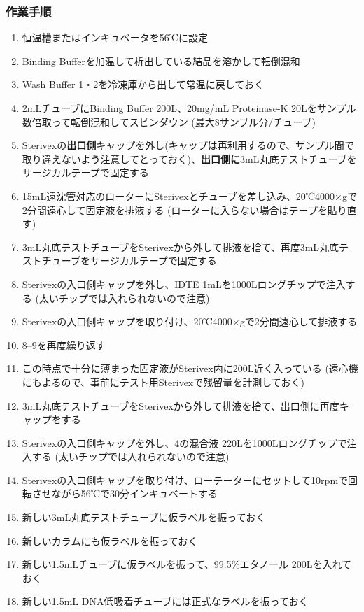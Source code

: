 \documentclass[titlepage,10pt,a4paper,uplatex]{jsbook}
\renewcommand{\textbf}[1]{{\bfseries\sffamily#1}}
\begin{document}
\subsubsection{作業手順}
\begin{enumerate}
\item 恒温槽またはインキュベータを56℃に設定
\item Binding Bufferを加温して析出している結晶を溶かして転倒混和
\item Wash Buffer 1・2を冷凍庫から出して常温に戻しておく
\item 2mLチューブにBinding Buffer 200{\textmu}L、20mg/mL Proteinase-K 20{\textmu}Lをサンプル数倍取って転倒混和してスピンダウン (最大8サンプル分/チューブ)
\item Sterivexの\textbf{出口側}キャップを外し(キャップは再利用するので、サンプル間で取り違えないよう注意してとっておく)、\textbf{出口側に}3mL丸底テストチューブをサージカルテープで固定する
\item 15mL遠沈管対応のローターにSterivexとチューブを差し込み、20℃4000×gで2分間遠心して固定液を排液する (ローターに入らない場合はテープを貼り直す)
\item 3mL丸底テストチューブをSterivexから外して排液を捨て、再度3mL丸底テストチューブをサージカルテープで固定する
\item Sterivexの入口側キャップを外し、IDTE 1mLを1000{\textmu}Lロングチップで注入する (太いチップでは入れられないので注意)
\item Sterivexの入口側キャップを取り付け、20℃4000×gで2分間遠心して排液する
\item 8--9を再度繰り返す
\item この時点で十分に薄まった固定液がSterivex内に200{\textmu}L近く入っている (遠心機にもよるので、事前にテスト用Sterivexで残留量を計測しておく)
\item 3mL丸底テストチューブをSterivexから外して排液を捨て、出口側に再度キャップをする
\item Sterivexの入口側キャップを外し、4の混合液 220{\textmu}Lを1000{\textmu}Lロングチップで注入する (太いチップでは入れられないので注意)
\item Sterivexの入口側キャップを取り付け、ローテーターにセットして10rpmで回転させながら56℃で30分インキュベートする
\item 新しい3mL丸底テストチューブに仮ラベルを振っておく
\item 新しいカラムにも仮ラベルを振っておく
\item 新しい1.5mLチューブに仮ラベルを振って、99.5\%エタノール 200{\textmu}Lを入れておく
\item 新しい1.5mL DNA低吸着チューブには正式なラベルを振っておく

\end{enumerate}
\end{document}
